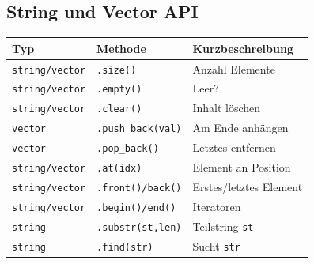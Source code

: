 \documentclass[10pt, a3paper, landscape]{article}
\begin{document}
\begin{multicols*}{4}
 \section{String und Vector API}
 \noindent
 \begin{tabularx}{\linewidth}{l l >{\RaggedRight}X}
 \toprule
\textbf{Typ} & \textbf{Methode} & \textbf{Kurzbeschreibung} \\
\midrule
\texttt{string/vector} & \lstinline|.size()| & Anzahl Elemente \\
\texttt{string/vector} & \lstinline|.empty()| & Leer? \\
\texttt{string/vector} & \lstinline|.clear()| & Inhalt löschen \\
\texttt{vector} & \lstinline|.push_back(val)| & Am Ende anhängen \\
\texttt{vector} & \lstinline|.pop_back()| & Letztes entfernen \\
\texttt{string/vector} & \lstinline|.at(idx)| & Element an Position \\
\texttt{string/vector} & \lstinline|.front()/back()| & Erstes/letztes Element \\
\texttt{string/vector} & \lstinline|.begin()/end()| & Iteratoren \\
\texttt{string} & \lstinline|.substr(st,len)| & Teilstring \lstinline|st| \ \\
\texttt{string} & \lstinline|.find(str)| & Sucht \lstinline|str| \\
\bottomrule
\end{tabularx}


\end{multicols*}
\end{document}
